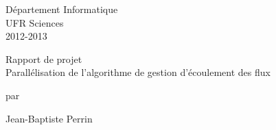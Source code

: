 \documentclass[12pt,a4paper,utf8x]{report}
\begin{document}
\begin{titlepage}

\begin{flushright}
   \hfill
   \begin{minipage}[t]{6cm} 
	Département Informatique\\
	UFR Sciences\\
	2012-2013
   \end{minipage}
\end{flushright}

\vspace{75mm}
\begin{center}
\normalsize{Rapport de projet}\\
\huge{Parallélisation de l'algorithme de gestion d'écoulement des flux}
\end{center}
\begin{center}
\large{par}
\end{center}
\begin{center}
\large{Jean-Baptiste Perrin}\\
\end{center}
\vspace{15mm}
\begin{center}
\end{center}


\end{titlepage}


\clearpage
\end{document}
